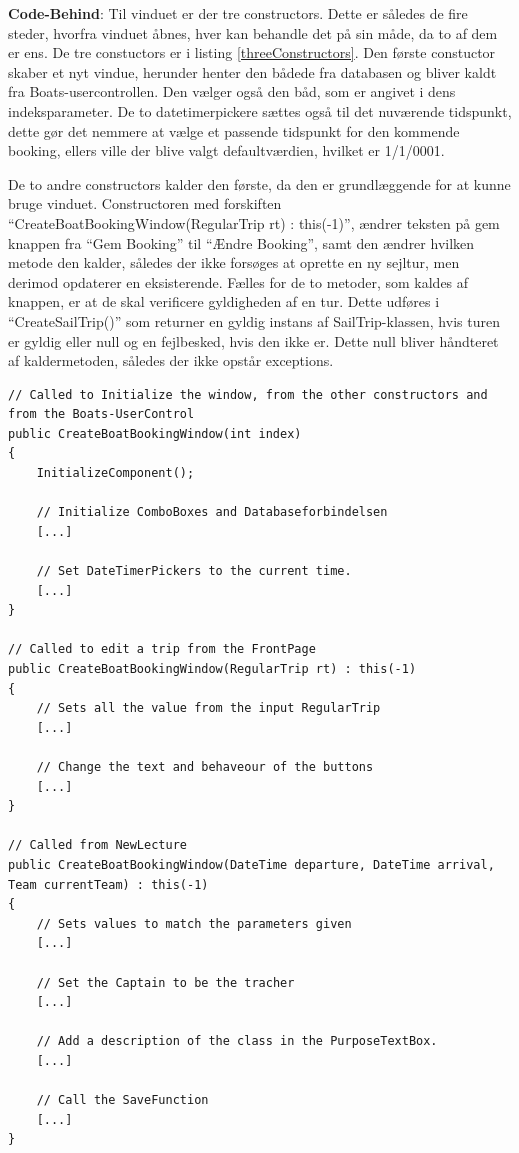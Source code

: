 \textbf{Code-Behind}: 
Til vinduet er der tre constructors. Dette er således de fire steder, hvorfra vinduet åbnes, hver kan behandle det på sin måde, da to af dem er ens. 
De tre constuctors er i listing \ref{threeConstructors}.
Den første constuctor skaber et nyt vindue, herunder henter den bådede fra databasen og bliver kaldt fra Boats-usercontrollen.
Den vælger også den båd, som er angivet i dens indeksparameter.
De to datetimerpickere sættes også til det nuværende tidspunkt, dette gør det nemmere at vælge et passende tidspunkt for den kommende booking, ellers ville der blive valgt defaultværdien, hvilket er 1/1/0001.

De to andre constructors kalder den første, da den er grundlæggende for at kunne bruge vinduet. 
Constructoren med forskiften ``CreateBoatBookingWindow(RegularTrip rt) : this(-1)'', ændrer teksten på gem knappen fra ``Gem Booking'' til ``Ændre Booking'',  samt den ændrer hvilken metode den kalder, således der ikke forsøges at oprette en ny sejltur, men derimod opdaterer en eksisterende. 
Fælles for de to metoder, som kaldes af knappen, er at de skal verificere gyldigheden af en tur. 
Dette udføres i ``CreateSailTrip()'' som returner en gyldig instans af SailTrip-klassen, hvis turen er gyldig eller null og en fejlbesked, hvis den ikke er. 
Dette null bliver håndteret af kaldermetoden, således der ikke opstår exceptions.

\begin{lstlisting}[frame=single, caption=De tre constuctoreres forskrifter, label=threeConstructors]
// Called to Initialize the window, from the other constructors and from the Boats-UserControl
public CreateBoatBookingWindow(int index)
{
    InitializeComponent();

    // Initialize ComboBoxes and Databaseforbindelsen
    [...]

    // Set DateTimerPickers to the current time.
    [...]
}

// Called to edit a trip from the FrontPage
public CreateBoatBookingWindow(RegularTrip rt) : this(-1)
{
    // Sets all the value from the input RegularTrip
    [...]

    // Change the text and behaveour of the buttons
    [...]
}

// Called from NewLecture
public CreateBoatBookingWindow(DateTime departure, DateTime arrival, Team currentTeam) : this(-1)
{
    // Sets values to match the parameters given
    [...]

    // Set the Captain to be the tracher
    [...]

    // Add a description of the class in the PurposeTextBox.
    [...]

    // Call the SaveFunction
    [...]
}
\end{lstlisting}

